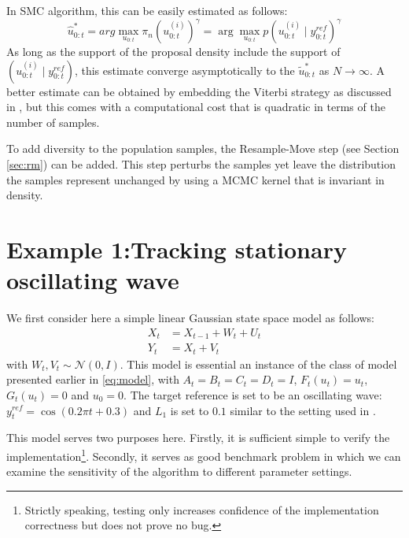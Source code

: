 In SMC algorithm, this can be easily estimated as follows:
\begin{equation}
\hat{u}^*_{0:t} = arg\max_{u_{0:t}} \pi_n(u^{(i)}_{0:t})^\gamma = \arg\max_{u_{0:t}} p(u^{(i)}_{0:t} \mid y^{ref}_{0:t})^\gamma
\end{equation}
As long as the support of the proposal density include the support of $(u^{(i)}_{0:t} \mid y^{ref}_{0:t})$, this estimate converge asymptotically to the $\tilde{u}^*_{0:t}$ as $N \to \infty$. A better estimate can be obtained by embedding the Viterbi strategy as discussed in \cite{SG01}, but this comes with a computational cost that is quadratic in terms of the number of samples.

To add diversity to the population samples, the Resample-Move step (see Section \ref{sec:rm}) can be added. This step perturbs the samples yet leave the distribution the samples represent unchanged by using a MCMC kernel that is invariant in density.

\section{Example 1:Tracking stationary oscillating wave}
\label{sec:exp1}
We first consider here a simple linear Gaussian state space model as follows:
\begin{align}
  X_t &= X_{t-1} + W_t + U_t \nonumber \\
  Y_t &= X_t + V_t
\label{eq:refnmodel}
\end{align}
with $W_t, V_t \sim \mathcal{N}(0,I)$. This model is essential an instance of the class of model presented earlier in \eqref{eq:model}, with $A_t=B_t=C_t=D_t=I$, $F_t(u_t)=u_t$, $G_t(u_t)=0$ and $u_0=0$. The target reference is set to be an oscillating wave: $y^{ref}_t = \cos(0.2 \pi t + 0.3)$ and $L_1$ is set to $0.1$ similar to the setting used in \cite{NK11}.

This model serves two purposes here. Firstly, it is sufficient simple to verify the implementation\footnote{Strictly speaking, testing only increases confidence of the implementation correctness but does not prove no bug.}. Secondly, it serves as good benchmark problem in which we can examine the sensitivity of the algorithm to different parameter settings.

